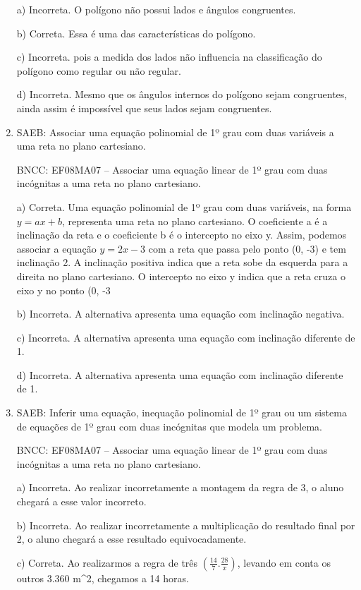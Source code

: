 \begin{enumerate}
a) Incorreta. O polígono não possui lados e ângulos congruentes.

b) Correta. Essa é uma das características do polígono.

c) Incorreta. pois a medida dos lados não influencia na classificação
do polígono como regular ou não regular.

d) Incorreta. Mesmo que os ângulos internos do polígono sejam
congruentes, ainda assim é impossível que seus lados sejam congruentes.

\item SAEB: Associar uma equação polinomial de 1º grau com duas variáveis a
uma reta no plano cartesiano.

BNCC: EF08MA07 -- Associar uma equação linear de 1º grau com duas
incógnitas a uma reta no plano cartesiano.

a) Correta. Uma equação polinomial de 1º grau com duas variáveis,
na forma $y = ax + b$, representa uma reta no plano cartesiano. O
coeficiente a é a inclinação da reta e o coeficiente b é o intercepto no
eixo y. Assim, podemos associar a equação $y = 2x - 3$ com a reta que
passa pelo ponto (0, -3) e tem inclinação 2. A inclinação positiva
indica que a reta sobe da esquerda para a direita no plano cartesiano. O
intercepto no eixo y indica que a reta cruza o eixo y no ponto (0, -3

b) Incorreta. A alternativa apresenta uma equação com inclinação
negativa.

c) Incorreta. A alternativa apresenta uma equação com inclinação
diferente de 1.

d) Incorreta. A alternativa apresenta uma equação com inclinação
diferente de 1.

\item SAEB: Inferir uma equação, inequação polinomial de 1º grau ou um sistema
de equações de 1º grau com duas incógnitas que modela um problema.

BNCC: EF08MA07 -- Associar uma equação linear de 1º grau com duas
incógnitas a uma reta no plano cartesiano.

a) Incorreta. Ao realizar incorretamente a montagem da
regra de 3, o aluno chegará a esse valor incorreto.

b) Incorreta. Ao realizar incorretamente a
multiplicação do resultado final por 2, o aluno chegará a esse resultado
equivocadamente.

c) Correta. Ao realizarmos a regra de três
$(\frac{14}{7} . \frac{28}{x})$, levando em conta os outros 3.360 m^2,
chegamos a 14 horas.


\end{enumerate}
